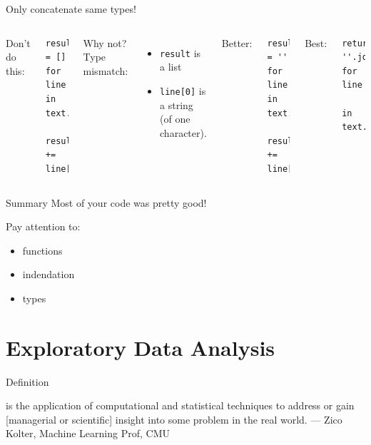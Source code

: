 \documentclass{beamer}
\begin{document}
\begin{frame}[fragile]{Only concatenate same types!}
\begin{columns}[T]
Don't do this:
\begin{lstlisting}
result = []
for line in text.splitlines():
    result += line[0]
\end{lstlisting}
Why not? Type mismatch:
    \begin{itemize}
        \item \texttt{result} is a list
        \item \texttt{line[0]} is a string \\
            (of one character).
    \end{itemize}
\pause{}
Better:
\begin{lstlisting}
result = ''
for line in text.splitlines():
    result += line[0]
\end{lstlisting}
Best:
\begin{lstlisting}
return ''.join(line[0] for line
        in text.splitlines())
\end{lstlisting}
\end{columns}
\end{frame}


\begin{frame}{Summary}
    Most of your code was pretty good!
    
    \vspace{1em}
    Pay attention to:
    \begin{itemize}
        \item functions
        \item indendation
        \item types
    \end{itemize}
\end{frame}





\section{Exploratory Data Analysis}
\frame{\tableofcontents[currentsection]}

\begin{frame}{Definition}
    \begin{definition}
     is the application of
    computational and statistical techniques to
    address or gain [managerial or scientific]
    insight into some problem in the real world.
    --- Zico Kolter, Machine Learning Prof, CMU
    \end{definition}
\end{frame}
\end{document}
